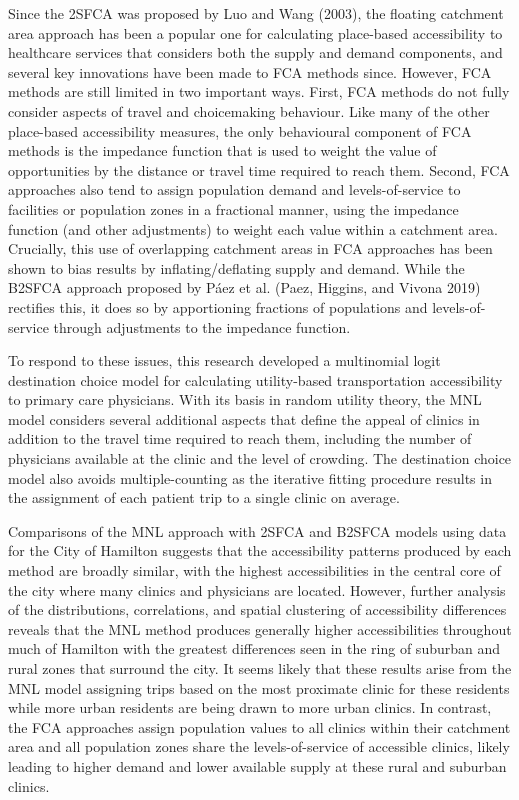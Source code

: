 \documentclass{article}
\begin{document}
Since the 2SFCA was proposed by Luo and Wang (2003), the floating
catchment area approach has been a popular one for calculating
place-based accessibility to healthcare services that considers both the
supply and demand components, and several key innovations have been made
to FCA methods since. However, FCA methods are still limited in two
important ways. First, FCA methods do not fully consider aspects of
travel and choicemaking behaviour. Like many of the other place-based
accessibility measures, the only behavioural component of FCA methods is
the impedance function that is used to weight the value of opportunities
by the distance or travel time required to reach them. Second, FCA
approaches also tend to assign population demand and levels-of-service
to facilities or population zones in a fractional manner, using the
impedance function (and other adjustments) to weight each value within a
catchment area. Crucially, this use of overlapping catchment areas in
FCA approaches has been shown to bias results by inflating/deflating
supply and demand. While the B2SFCA approach proposed by Páez et al.
(Paez, Higgins, and Vivona 2019) rectifies this, it does so by
apportioning fractions of populations and levels-of-service through
adjustments to the impedance function.

To respond to these issues, this research developed a multinomial logit
destination choice model for calculating utility-based transportation
accessibility to primary care physicians. With its basis in random
utility theory, the MNL model considers several additional aspects that
define the appeal of clinics in addition to the travel time required to
reach them, including the number of physicians available at the clinic
and the level of crowding. The destination choice model also avoids
multiple-counting as the iterative fitting procedure results in the
assignment of each patient trip to a single clinic on average.

Comparisons of the MNL approach with 2SFCA and B2SFCA models using data
for the City of Hamilton suggests that the accessibility patterns
produced by each method are broadly similar, with the highest
accessibilities in the central core of the city where many clinics and
physicians are located. However, further analysis of the distributions,
correlations, and spatial clustering of accessibility differences
reveals that the MNL method produces generally higher accessibilities
throughout much of Hamilton with the greatest differences seen in the
ring of suburban and rural zones that surround the city. It seems likely
that these results arise from the MNL model assigning trips based on the
most proximate clinic for these residents while more urban residents are
being drawn to more urban clinics. In contrast, the FCA approaches
assign population values to all clinics within their catchment area and
all population zones share the levels-of-service of accessible clinics,
likely leading to higher demand and lower available supply at these
rural and suburban clinics.
\end{document}
